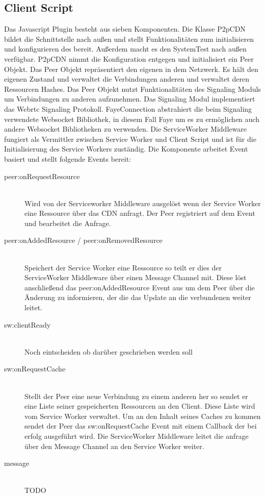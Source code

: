 \subsection{Client Script}

Das Javascript Plugin besteht aus sieben Komponenten. Die Klasse P2pCDN bildet die Schnittstelle nach außen und stellt Funktionalitäten zum initialisieren und konfigurieren des \cdns bereit. Außerdem macht es den SystemTest nach außen verfügbar. P2pCDN nimmt die Konfiguration entgegen und initialisiert ein Peer Objekt. Das Peer Objekt repräsentiert den eigenen \client in dem \pTp Netzwerk. Es hält den eigenen Zustand und verwaltet die Verbindungen anderen \clients und verwaltet deren Ressourcen Hashes. Das Peer Objekt nutzt Funktionalitäten des Signaling Moduls um Verbindungen zu anderen \clients aufzunehmen. Das Signaling Modul implementiert das Webrtc Signaling Protokoll. FayeConnection abstrahiert die beim Signaling verwendete Websocket Bibliothek, in diesem Fall Faye um es zu ermöglichen auch andere Websocket Bibliotheken zu verwenden.
Die ServiceWorker Middleware fungiert als Vermittler zwischen Service Worker und Client Script und ist für die Initialisierung des Service Workers zuständig. Die Komponente arbeitet Event basiert und stellt folgende Events bereit:
\begin{description}
	\item[peer:onRequestResource]\hfill \\
	Wird von der Serviceworker Middleware ausgelöst wenn der Service Worker eine Ressource über das \pTp CDN anfragt. Der Peer registriert auf dem Event und bearbeitet die Anfrage.
	\item[peer:onAddedResource / peer:onRemovedResource]\hfill \\
	Speichert der Service Worker eine Ressource so teilt er dies der ServiceWorker Middleware über einen Message Channel mit. Diese löst anschließend das peer:onAddedResource Event aus um dem Peer über die Änderung zu informieren, der die das Update an die verbundenen \clients weiter leitet.
	\item[sw:clientReady]\hfill \\
	Noch eintscheiden ob darüber geschrieben werden soll
	\item[sw:onRequestCache]\hfill \\
	Stellt der Peer eine neue Verbindung zu einem anderen \client her so sendet er eine Liste seiner gespeicherten Ressourcen an den Client. Diese Liste wird vom Service Worker verwaltet. Um an den Inhalt seines Caches zu kommen sendet der Peer das sw:onRequestCache Event mit einem Callback der bei erfolg ausgeführt wird. Die ServiceWorker Middleware leitet die anfrage über den Message Channel an den Service Worker weiter.
	\item[message]\hfill \\
	TODO
\end{description}

